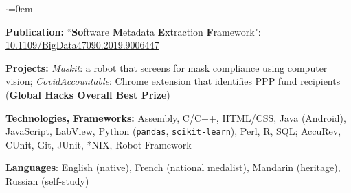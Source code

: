 \begin{list}{$\cdot$}{\leftmargin=0em} %
   \item \textbf{Publication:} ``\textbf{So}ftware \textbf{M}etadata \textbf{E}xtraction \textbf{F}ramework": \href{https://doi.org/10.1109/BigData47090.2019.9006447}{10.1109/BigData47090.2019.9006447}
   \item \textbf{Projects:} \textit{Maskit}: a robot that screens for mask compliance using computer vision; \textit{CovidAccountable}: Chrome extension that identifies \href{https://web.archive.org/web/20200903224716/https://www.sba.gov/funding-programs/loans/coronavirus-relief-options/paycheck-protection-program}{PPP} fund recipients (\textbf{Global Hacks Overall Best Prize})%
   \item \textbf{Technologies, Frameworks:} Assembly, C/C++, HTML/CSS, Java (Android), JavaScript, LabView, Python (\texttt{pandas}, \texttt{scikit-learn}), Perl, R, SQL; AccuRev, CUnit, Git, JUnit, *NIX, Robot Framework
   \item \textbf{Languages}: English (native), French (national medalist), Mandarin (heritage), Russian (self-study)
\end{list}
